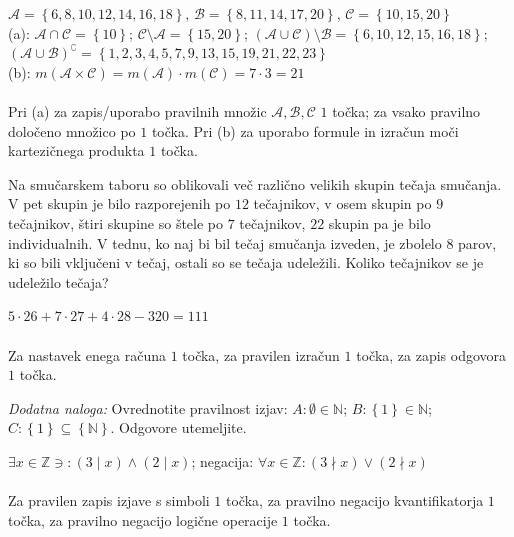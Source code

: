 \documentclass[addpoints]{exam}
\begin{document}
\begin{questions}
    \begin{solution}[13cm]
        $\mathcal{A}=\left\{6,8,10,12,14,16,18\right\}$, $\mathcal{B}=\left\{8,11,14,17,20\right\}$, $\mathcal{C}=\left\{10,15,20\right\}$ \\
        (a): $\mathcal{A}\cap\mathcal{C}=\left\{10\right\}$; $\mathcal{C}\setminus\mathcal{A}=\left\{15,20\right\}$; $(\mathcal{A}\cup\mathcal{C})\setminus\mathcal{B}=\left\{6,10,12,15,16,18\right\}$; $(\mathcal{A}\cup\mathcal{B})^\complement=\left\{1,2,3,4,5,7,9,13,15,19,21,22,23\right\}$ \\
        (b): $m(\mathcal{A}\times\mathcal{C})=m(\mathcal{A})\cdot m(\mathcal{C})=7\cdot 3 = 21$ \\ \\
        Pri (a) za zapis/uporabo pravilnih množic $\mathcal{A}, \mathcal{B}, \mathcal{C}$ $1$ točka; za vsako pravilno določeno množico po $1$ točka. Pri (b) za uporabo formule in izračun moči kartezičnega produkta $1$ točka.
    \end{solution}


        

    \question[3]
    Na smučarskem taboru so oblikovali več različno velikih skupin tečaja smučanja.
    V pet skupin je bilo razporejenih po $12$ tečajnikov, v osem skupin po $9$ tečajnikov, štiri skupine so štele po $7$ tečajnikov, $22$ skupin pa je bilo individualnih.
    V tednu, ko naj bi bil tečaj smučanja izveden, je zbolelo $8$ parov, ki so bili vključeni v tečaj, ostali so se tečaja udeležili.
    Koliko tečajnikov se je udeležilo tečaja?

    \begin{solution}[5cm]
        $5\cdot 26+7\cdot 27+4\cdot 28-320=111$ \\ \\
        Za nastavek enega računa $1$ točka, za pravilen izračun $1$ točka, za zapis odgovora $1$ točka.
    \end{solution}


\newpage

    \vspace{0.1in}

    \bonusquestion[3]
    \textit{Dodatna naloga:} Ovrednotite pravilnost izjav: $A: \emptyset\in\mathbb{N}$; $B:\left\{1\right\}\in\mathbb{N}$; $C: \left\{1\right\}\subseteq\left\{\mathbb{N}\right\}$. Odgovore utemeljite.
    \begin{solution}
        $\exists x\in\mathbb{Z}\ni:(3\mid x)\land(2\mid x)$; negacija: $\forall x\in\mathbb{Z}: (3\nmid x)\lor(2\nmid x)$ \\ \\
        Za pravilen zapis izjave s simboli $1$ točka, za pravilno negacijo kvantifikatorja $1$ točka, za pravilno negacijo logične operacije $1$ točka.
    \end{solution}

\end{questions}
\end{document}

